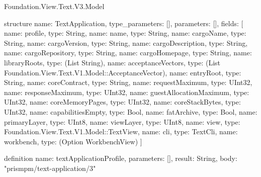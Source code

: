 \begin{lexlean}{Foundation.View.Text.V3.Model}
\begin{semanticmodule}
structure{
  name: TextApplication,
  type_parameters: [],
  parameters: [],
  fields: [
    {name: profile, type: String},
    {name: name, type: String},
    {name: cargoName, type: String},
    {name: cargoVersion, type: String},
    {name: cargoDescription, type: String},
    {name: cargoRepository, type: String},
    {name: cargoHomepage, type: String},
    {name: libraryRoots, type: (List String)},
    {name: acceptanceVectors, type: (List Foundation.View.Text.V1.Model::AcceptanceVector)},
    {name: entryRoot, type: String},
    {name: coreContract, type: String},
    {name: requestMaximum, type: UInt32},
    {name: responseMaximum, type: UInt32},
    {name: guestAllocationMaximum, type: UInt32},
    {name: coreMemoryPages, type: UInt32},
    {name: coreStackBytes, type: UInt32},
    {name: capabilitiesEmpty, type: Bool},
    {name: fatArchive, type: Bool},
    {name: primaryLayer, type: UInt8},
    {name: viewLayer, type: UInt8},
    {name: view, type: Foundation.View.Text.V1.Model::TextView},
    {name: cli, type: TextCli},
    {name: workbench, type: (Option WorkbenchView)}
  ]
}

definition{
  name: textApplicationProfile,
  parameters: [],
  result: String,
  body: "prismpm/text-application/3"
}
\end{semanticmodule}
\end{lexlean}
